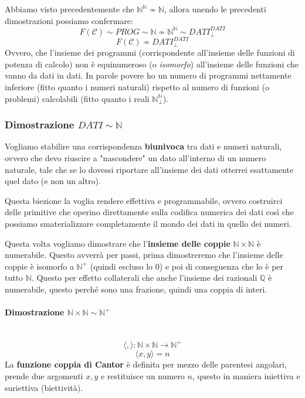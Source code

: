 \documentclass{article}
\begin{document}
Abbiamo visto precedentemente che $\mathbb{N}^{\mathbb{N}}\nsim\mathbb{N}$, allora unendo le precedenti
dimostrazioni possiamo confermare:
$$F(\mathcal{C})\sim PROG\sim\mathbb{N}\nsim\mathbb{N}^{\mathbb{N}}\sim DATI_{\bot}^{DATI}$$
$$F(\mathcal{C})\nsim DATI_{\bot}^{DATI}$$
Ovvero, che l'insieme dei programmi (corrispondente all'insieme delle funzioni di potenza di calcolo)
non è equinumeroso (o \textit{isomorfo}) all'insieme delle funzioni che vanno da dati in dati. In parole
povere ho un numero di programmi nettamente inferiore (fitto quanto i numeri naturali) rispetto al numero
di funzioni (o problemi) calcolabili (fitto quanto i reali $\mathbb{N}_{\bot}^{\mathbb{N}}$).

\subsubsection{Dimostrazione $DATI\sim\mathbb{N}$}
Vogliamo stabilire una corrispondenza \textbf{biunivoca} tra dati e numeri naturali, ovvero
che devo riuscire a "nascondere" un dato all'interno di un numero naturale, tale che
se lo dovessi riportare all'insieme dei dati otterrei esattamente quel dato (e non un altro).

Questa biezione la voglia rendere effettiva e programmabile, ovvero costruirci delle primitive che
operino direttamente sulla codifica numerica dei dati così che possiamo smaterializzare completamente
il mondo dei dati in quello dei numeri.

Questa volta vogliamo dimostrare che l'\textbf{insieme delle coppie} $\mathbb{N}\times\mathbb{N}$
è numerabile. Questo avverrà per passi, prima dimostreremo che l'insieme delle coppie è isomorfo a
$\mathbb{N}^+$ (quindi escluso lo $0$) e poi di conseguenza che lo è per tutto $\mathbb{N}$.
Questo per effetto collaterali che anche l'insieme dei razionali $\mathbb{Q}$ è numerabile,
questo perché sono una frazione, quindi una coppia di interi.
\paragraph{Dimostrazione $\mathbb{N}\times\mathbb{N}\sim\mathbb{N}^+$}\mbox{}\\
$$\langle ,\rangle :\mathbb{N}\times\mathbb{N}\rightarrow\mathbb{N}^+$$
$$\langle x,y\rangle =n$$
La \textbf{funzione coppia di Cantor} è definita per mezzo delle parentesi
angolari, prende due argomenti $x,y$ e restituisce un numero $n$, questo
in maniera iniettiva e suriettiva (biettività).
\end{document}
